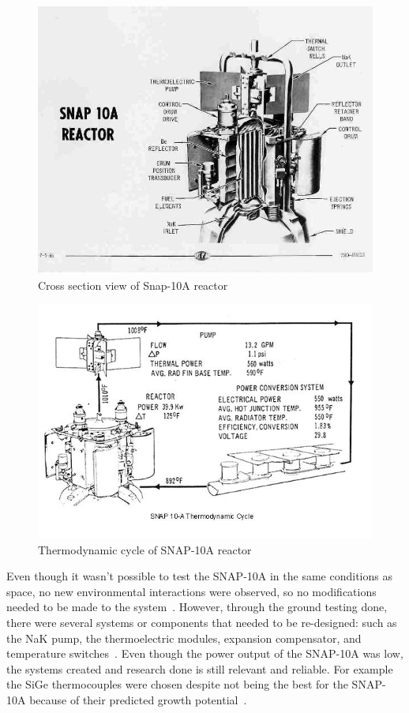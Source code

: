 \documentclass{article}
\begin{document}
\begin{figure}[]
	\centering
	\includegraphics[height=0.45\textheight]{fig/appC}
	\caption[Cross section view of Snap-10A reactor]{Cross section view of Snap-10A reactor~\cite{websnap}}
	\label{appC}
\end{figure}


\begin{figure}[]
	\centering
	\includegraphics[height=0.45\textheight]{fig/appD}
	\caption[Thermodynamic cycle of SNAP-10A reactor]{Thermodynamic cycle of SNAP-10A reactor~\cite{websnap}}
	\label{appD}
\end{figure}



    Even though it wasn't possible to test the SNAP-10A in the same conditions as space, no new environmental interactions were observed, so no modifications needed to be made to the system~\cite{ohlenkamp1966snap}. However, through the ground testing done, there were several systems or components that needed to be re-designed: such as the NaK pump, the thermoelectric modules, expansion compensator, and temperature switches~\cite{voss1984snap}. Even though the power output of the SNAP-10A was low, the systems created and research done is still relevant and reliable. For example the SiGe thermocouples were chosen despite not being the best for the SNAP-10A because of their predicted growth potential~\cite{voss1984snap}. 
\end{document}
